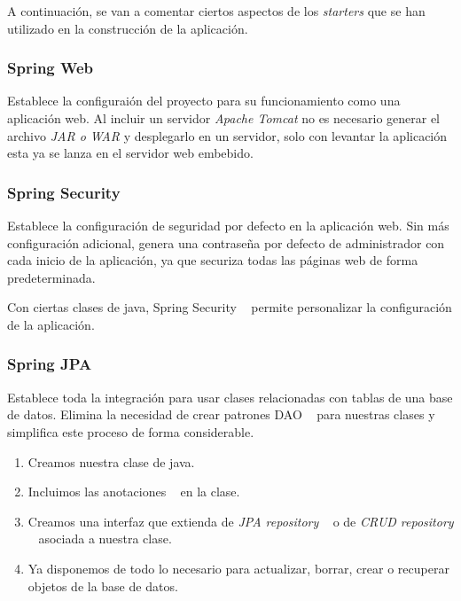 A continuación, se van a comentar ciertos aspectos de los \textit{starters} que se han utilizado en la construcción de la aplicación.

\subsubsection{Spring Web}

Establece la configuraión del proyecto para su funcionamiento como una aplicación web. Al incluir un servidor \textit{Apache Tomcat} no es necesario generar el archivo \textit{JAR o WAR} y desplegarlo en un servidor, solo con levantar la aplicación esta ya se lanza en el servidor web embebido.
 

\subsubsection{Spring Security}

Establece la configuración de seguridad por defecto en la aplicación web. Sin más configuración adicional, genera una contraseña por defecto de administrador con cada inicio de la aplicación, ya que securiza todas las páginas web de forma predeterminada.

Con ciertas clases de java, Spring Security ~\cite{web:springSecurity} permite personalizar la configuración de la aplicación.

\subsubsection{Spring JPA}

Establece toda la integración para usar clases relacionadas con tablas de una base de datos. Elimina la necesidad de crear patrones DAO ~\cite{web:dao} para nuestras clases y simplifica este proceso de forma considerable.

\begin{enumerate}
	\item Creamos nuestra clase de java.
	\item Incluimos las anotaciones ~\cite{web:anotacionesJPA} en la clase.
	\item Creamos una interfaz que extienda de \textit{JPA repository}  ~\cite{web:springJPArepo} o de \textit{CRUD repository} ~\cite{web:springCRUDrepo} asociada a nuestra clase.
	\item Ya disponemos de todo lo necesario para actualizar, borrar, crear o recuperar objetos de la base de datos.
\end{enumerate}

